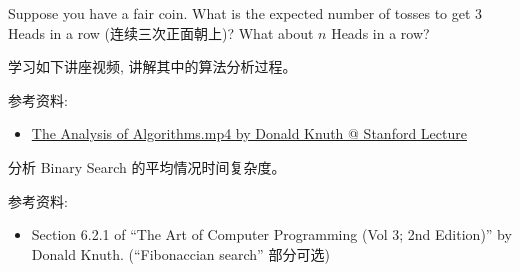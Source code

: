 \documentclass[a4paper, justified]{tufte-handout}
\begin{document}
\begin{solution}
\end{solution}

\begin{problem}[TC 5.3-3]
\end{problem}

\begin{solution}
\end{solution}

\begin{problem}[TC 5.3-4]
\end{problem}

\begin{solution}
\end{solution}

\begin{problem}[TC Problem 5-2 ($e, f, g$)]
\end{problem}

\begin{solution}
\end{solution}

\beginoptional

\begin{problem}
  Suppose you have a fair coin. 
  What is the expected number of tosses to get 3 Heads in a row (连续三次正面朝上)?
  What about $n$ Heads in a row?
\end{problem}

\begin{solution}
\end{solution}

\beginot

\begin{ot}
学习如下讲座视频, 讲解其中的算法分析过程。

  \noindent 参考资料:
  \begin{itemize}
    \item \href{https://box.nju.edu.cn/f/7fda9901c7784314b3a6/}{The Analysis of Algorithms.mp4 by Donald Knuth @ Stanford Lecture}
  \end{itemize}
\end{ot}

\begin{ot}
  分析 Binary Search 的平均情况时间复杂度。

  \noindent 参考资料:
  \begin{itemize}
    \item Section 6.2.1 of ``The Art of Computer Programming (Vol 3; 2nd Edition)'' by Donald Knuth.
      (``Fibonaccian search'' 部分可选)
  \end{itemize}
\end{ot}
\end{document}

